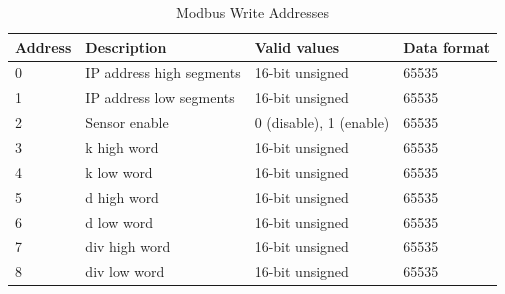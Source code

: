 \begin{table}[h]
    \centering
    \begin{tabular}{|l|l|l|l|}
    \hline \textbf{Address} & \textbf{Description} & \textbf{Valid values} & \textbf{Data format} \\ 
    \hline
    \hline 0 & IP address high segments & 16-bit unsigned & 65535 \\ 
    \hline 1 & IP address low segments & 16-bit unsigned & 65535 \\ 
    \hline 2 & Sensor enable & 0 (disable), 1 (enable) & 65535 \\ 
    \hline 3 & k high word & 16-bit unsigned & 65535 \\ 
    \hline 4 & k low word & 16-bit unsigned & 65535 \\ 
    \hline 5 & d high word & 16-bit unsigned & 65535 \\ 
    \hline 6 & d low word & 16-bit unsigned & 65535 \\ 
    \hline 7 & div high word & 16-bit unsigned & 65535 \\ 
    \hline 8 & div low word & 16-bit unsigned & 65535 \\ 
    \hline 
    \end{tabular}
    \caption{Modbus Write Addresses}
\end{table}

